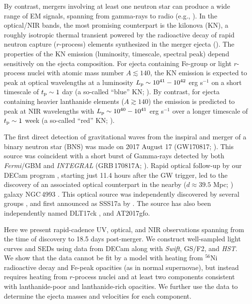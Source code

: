 By contrast, mergers involving at least one neutron star can produce a wide range of EM signals, spanning from gamma-rays to radio (e.g., \citealt{MetzgerBerger12}). In the optical/NIR bands, the most promising counterpart is the kilonova (KN), a roughly isotropic thermal transient powered by the radioactive decay of rapid neutron capture ($r$-process) elements synthesized in the merger ejecta (\citealt{LP98,Metzger+10,Roberts+11,MetzgerBerger12,BarnesKasen13,Tanaka+14}).
The properties of the KN emission (luminosity, timescale, spectral peak) depend sensitively on the ejecta composition.  For ejecta containing Fe-group or light $r$-process nuclei with atomic mass number $A\lesssim 140$, the KN emission is expected to peak at optical wavelengths at a luminosity $L_{\rm p}\sim 10^{41}-10^{42}$ erg s$^{-1}$ on a short timescale of $t_{\rm p}\sim 1$ day (a so-called ``blue'' KN; \citealt{Metzger+10,Roberts+11,MetzgerFernandez2014}).  By contrast, for ejecta containing heavier lanthanide elements ($A\gtrsim 140$) the emission is predicted to peak at NIR wavelengths with $L_{\rm p} \sim 10^{40}-10^{41}$ erg s$^{-1}$ over a longer timescale of $t_{\rm p}\sim 1$ week (a so-called ``red'' KN; \citealt{BarnesKasen13,Kasen+13,Tanaka+14}).

The first direct detection of gravitational waves from the inspiral and merger of a binary neutron star (BNS) was made on 2017 August 17 (GW170817; \citealt{LIGOGW170817}). This source was coincident with a short burst of Gamma-rays detected by both {\it Fermi}/GBM and {\it INTEGRAL} (GRB\,170817A; \citealt{GW170817Fermi,Savchenko+17}). Rapid optical follow-up by our DECam program \citep{Flaugher+15}, starting just 11.4 hours after the GW trigger, led to the discovery of an associated optical counterpart in the nearby ($d\approx 39.5$ Mpc; \citealt{Freedman+01}) galaxy NGC\,4993 \citep{GW170817DECam}. This optical source was independently discovered by several groups \citep{LIGOMMAPaper}, and first announced as SSS17a by \cite{Coulter+17}. The source has also been independently named DLT17ck \citep{Valenti+17}, and AT2017gfo.

Here we present rapid-cadence UV, optical, and NIR observations spanning from the time of discovery to 18.5 days post-merger.  We construct well-sampled light curves and SEDs using data from DECam along with {\it Swift}, GS/F2, and {\it HST}. We show that the data cannot be fit by a model with heating from $^{56}$Ni radioactive decay and Fe-peak opacities (as in normal supernovae), but instead requires heating from $r$-process nuclei and at least two components consistent with lanthanide-poor and lanthanide-rich opacities. We further use the data to determine the ejecta masses and velocities for each component.

